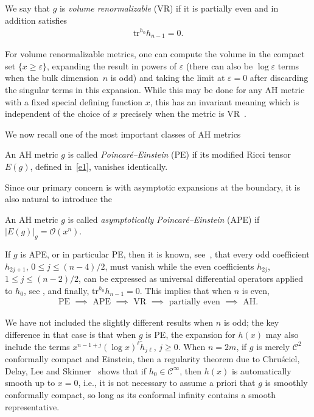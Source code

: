 \documentclass[pdftex]{sigma}
\numberwithin{equation}{section}
\renewcommand{\epsilon}{\varepsilon}
\newcommand{\calO}{\mathcal O}
\newcommand{\calC}{\mathcal C}
\newcommand{\e}{\epsilon}
\newcommand{\tr}{\mathrm{tr}}
\begin{document}
\begin{Definition}\label{definition1.2}We say that $g$ is \emph{volume renormalizable} (VR) if it is partially even and in addition satisfies
\begin{gather*}%
\tr^{h_0} h_{n-1} = 0.
\end{gather*}
\end{Definition}

For volume renormalizable metrics, one can compute the volume in the compact set $\{x \geq \e\}$, expanding the result in powers of $\epsilon$ (there can also be $\log \epsilon$ terms when the bulk dimen\-sion~$n$ is odd) and taking the limit at $\e = 0$ after discarding the singular terms in this expansion. While this may be done for any AH metric with a fixed special defining function $x$, this has an invariant meaning which is independent of the choice of $x$ precisely when the metric is VR~\cite{Gr}.

We now recall one of the most important classes of AH metrics
\begin{Definition}\label{definition1.3} An AH metric $g$ is called \emph{Poincar\'e--Einstein} (PE) if its modified Ricci tensor~$E(g)$, defined in~\eqref{e1}, vanishes identically.
\end{Definition}
Since our primary concern is with asymptotic expansions at the boundary, it is also natural to introduce the
\begin{Definition}\label{definition1.4}
An AH metric $g$ is called \emph{asymptotically Poincar\'e--Einstein} (APE) if $|E(g)|_{g} = \calO( x^n)$.
\end{Definition}

If $g$ is APE, or in particular PE, then it is known, see~\cite{FG2}, that every odd coefficient $h_{2j+1}$, $0 \leq j \leq (n-4)/2$, must
vanish while the even coefficients $h_{2j}$, $1 \leq j \leq (n-2)/2$, can be expressed as universal differential operators applied
to $h_0$, see \cite{FG2}, and finally, $\tr^{h_0} h_{n-1} = 0$. This implies that when $n$ is even,
\begin{gather*}
	\text{PE $\implies$ APE $\implies$ VR $\implies$ partially even $\implies$ AH.}
\end{gather*}

We have not included the slightly different results when $n$ is odd; the key difference in that case is that when $g$ is PE, the expansion for $h(x)$ may also include the terms $x^{n-1+j} (\log x)^\ell \tilde{h}_{j\ell}$, $j \geq 0$. When $n=2m$, if $g$ is merely $\calC^2$ conformally compact and Einstein, then a regularity theorem due to Chru\'sciel, Delay, Lee and Skinner~\cite{CDLS} shows that if $h_0 \in \calC^\infty$, then $h(x)$ is automatically smooth up to $x=0$, i.e., it is not necessary to assume a priori that $g$ is smoothly conformally compact, so long as its conformal infinity contains a smooth representative.
\end{document}
